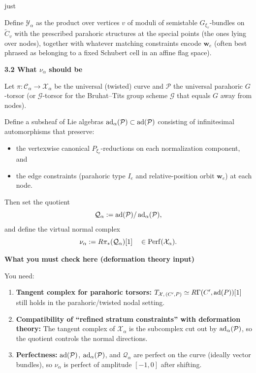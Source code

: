 just \documentclass[12pt]{article}
\begin{document}
Define $\mathcal Y_\alpha$ as the product over vertices $v$ of moduli of semistable $G_{\xi_v}$-bundles on $\widetilde C_v$ with the prescribed parahoric structures at the special points (the ones lying over nodes), together with whatever matching constraints encode $\mathbf w_e$ (often best phrased as belonging to a fixed Schubert cell in an affine flag space).

\medskip\noindent\textbf{3.2 What $\nu_\alpha$ should be}

Let $\pi:\mathcal C_\alpha\to \mathcal X_\alpha$ be the universal (twisted) curve and $\mathcal P$ the universal parahoric $G$-torsor (or $\mathcal G$-torsor for the Bruhat--Tits group scheme $\mathcal G$ that equals $G$ away from nodes).

Define a subsheaf of Lie algebras $\operatorname{ad}_\alpha(\mathcal P)\subset \operatorname{ad}(\mathcal P)$ consisting of infinitesimal automorphisms that preserve:
\begin{itemize}
\item the vertexwise canonical $P_{\xi_v}$-reductions on each normalization component, and
\item the edge constraints (parahoric type $I_e$ and relative-position orbit $\mathbf w_e$) at each node.
\end{itemize}

Then set the quotient
\[
\mathcal Q_\alpha := \operatorname{ad}(\mathcal P)/\operatorname{ad}_\alpha(\mathcal P),
\]
and define the virtual normal complex
\[
\nu_\alpha := R\pi_*(\mathcal Q_\alpha)[1]\quad\in \operatorname{Perf}(\mathcal X_\alpha).
\]

\medskip\noindent\textbf{What you must check here (deformation theory input)}

You need:
\begin{enumerate}
\item \textbf{Tangent complex for parahoric torsors:}
$T_{\mathcal X,\,(C',P)}\simeq R\Gamma(C',\operatorname{ad}(P))[1]$ still holds in the parahoric/twisted nodal setting.

\item \textbf{Compatibility of ``refined stratum constraints'' with deformation theory:}
The tangent complex of $\mathcal X_\alpha$ is the subcomplex cut out by $\operatorname{ad}_\alpha(\mathcal P)$, so the quotient controls the normal directions.

\item \textbf{Perfectness:}
$\operatorname{ad}(\mathcal P)$, $\operatorname{ad}_\alpha(\mathcal P)$, and $\mathcal Q_\alpha$ are perfect on the curve (ideally vector bundles), so $\nu_\alpha$ is perfect of amplitude $[-1,0]$ after shifting.
\end{enumerate}
\end{document}
